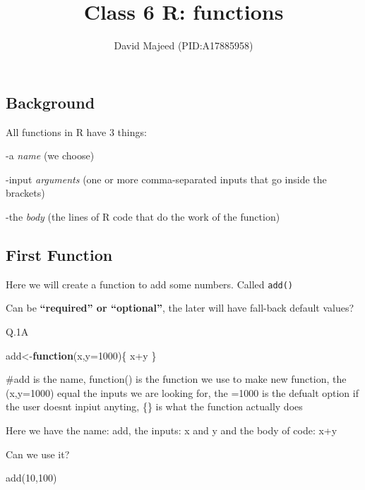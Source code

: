 \documentclass[
  letterpaper,
  DIV=11,
  numbers=noendperiod]{scrartcl}
\title{Class 6 R: functions}
\author{David Majeed (PID:A17885958)}
\date{}
\newenvironment{Shaded}{\begin{snugshade}}{\end{snugshade}}
\newcommand{\AttributeTok}[1]{\textcolor[rgb]{0.40,0.45,0.13}{#1}}
\newcommand{\CommentTok}[1]{\textcolor[rgb]{0.37,0.37,0.37}{#1}}
\newcommand{\ControlFlowTok}[1]{\textcolor[rgb]{0.00,0.23,0.31}{\textbf{#1}}}
\newcommand{\DecValTok}[1]{\textcolor[rgb]{0.68,0.00,0.00}{#1}}
\newcommand{\FunctionTok}[1]{\textcolor[rgb]{0.28,0.35,0.67}{#1}}
\newcommand{\NormalTok}[1]{\textcolor[rgb]{0.00,0.23,0.31}{#1}}
\newcommand{\OtherTok}[1]{\textcolor[rgb]{0.00,0.23,0.31}{#1}}
\newcommand{\SpecialCharTok}[1]{\textcolor[rgb]{0.37,0.37,0.37}{#1}}
\begin{document}
\maketitle


\subsection{Background}\label{background}

All functions in R have 3 things:

-a \emph{name} (we choose)

-input \emph{arguments} (one or more comma-separated inputs that go
inside the brackets)

-the \emph{body} (the lines of R code that do the work of the function)

\subsection{First Function}\label{first-function}

Here we will create a function to add some numbers. Called
\texttt{add()}

Can be \textbf{``required'' or ``optional''}, the later will have
fall-back default values?

Q.1A

\begin{Shaded}
\begin{Highlighting}[]
\NormalTok{add}\OtherTok{\textless{}{-}}\ControlFlowTok{function}\NormalTok{(x,}\AttributeTok{y=}\DecValTok{1000}\NormalTok{)\{}
\NormalTok{  x}\SpecialCharTok{+}\NormalTok{y}
\NormalTok{\}}

\CommentTok{\#add is the name, function() is the function we use to make new function, the (x,y=1000) equal the inputs we are looking for, the =1000 is the defualt option if the user doesn\textquotesingle{}t inpiut anyting, \{\} is what the function actually does}
\end{Highlighting}
\end{Shaded}

Here we have the name: add, the inputs: x and y and the body of code:
x+y

Can we use it?

\begin{Shaded}
\begin{Highlighting}[]
\FunctionTok{add}\NormalTok{(}\DecValTok{10}\NormalTok{,}\DecValTok{100}\NormalTok{)}
\end{Highlighting}
\end{Shaded}
\end{document}
